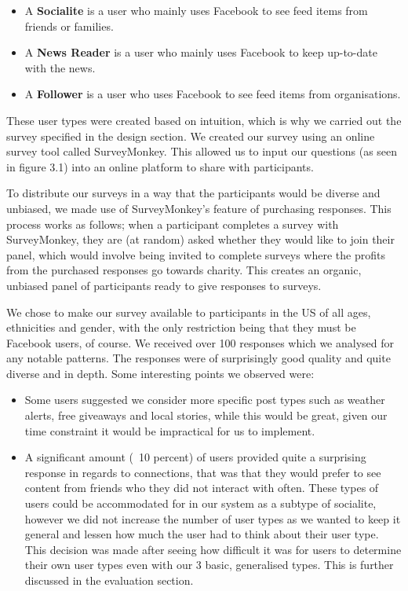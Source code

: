 \begin{itemize}
	\item A \textbf{Socialite} is a user who mainly uses Facebook to see feed items from friends or families.
	\item A \textbf{News Reader} is a user who mainly uses Facebook to keep up-to-date with the news.
	\item A \textbf{Follower} is a user who uses Facebook to see feed items from organisations.
\end{itemize}

These user types were created based on intuition, which is why we carried out the survey specified in the design section. We created our survey using an online survey tool called SurveyMonkey. This allowed us to input our questions (as seen in figure 3.1) into an online platform to share with participants.

To distribute our surveys in a way that the participants would be diverse and unbiased, we made use of SurveyMonkey’s feature of purchasing responses. This process works as follows; when a participant completes a survey with SurveyMonkey, they are (at random) asked whether they would like to join their panel, which would involve being invited to complete surveys where the profits from the purchased responses go towards charity. This creates an organic, unbiased panel of participants ready to give responses to surveys.

We chose to make our survey available to participants in the US of all ages, ethnicities and gender, with the only restriction being that they must be Facebook users, of course.
We received over 100 responses which we analysed for any notable patterns. The responses were of surprisingly good quality and quite diverse and in depth. Some interesting points we observed were:

\begin{itemize}
\item Some users suggested we consider more specific post types such as weather alerts, free giveaways and local stories, while this would be great, given our time constraint it would be impractical for us to implement.
\item A significant amount (~10 percent) of users provided quite a surprising response in regards to connections, that was that they would prefer to see content from friends who they did not interact with often. These types of users could be accommodated for in our system as a subtype of socialite, however we did not increase the number of user types as we wanted to keep it general and lessen how much the user had to think about their user type. This decision was made after seeing how difficult it was for users to determine their own user types even with our 3 basic, generalised types. This is further discussed in the evaluation section. 
\end{itemize}

